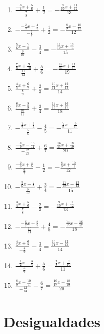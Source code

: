 \documentclass[12pt]{article}
\theoremstyle{plain}
\theoremstyle{definition}
\theoremstyle{remark}
\begin{document}
\begin{enumerate}
  \begin{enumerate}
  \def\labelenumii{\roman{enumii}.}
  \item
    \(\frac{-\frac{3}{4}x+\frac{5}{6}}{-\frac{7}{8}}+\frac{1}{2}=-\frac{\frac{9}{10}x+\frac{11}{12}}{13}\)
  \item
    \(-\frac{-\frac{2}{3}x+\frac{4}{5}}{-\frac{6}{7}}+\frac{1}{2}=-\frac{\frac{8}{9}x+\frac{10}{11}}{12}\)
  \item
    \(\frac{\frac{5}{6}x-\frac{7}{8}}{\frac{9}{10}}-\frac{3}{4}=-\frac{\frac{11}{12}x+\frac{13}{14}}{15}\)
  \item
    \(\frac{\frac{7}{8}x+\frac{9}{10}}{\frac{11}{12}}+\frac{5}{6}=-\frac{\frac{15}{16}x+\frac{17}{18}}{19}\)
  \item
    \(\frac{\frac{4}{5}x+\frac{6}{7}}{\frac{8}{9}}+\frac{2}{3}=\frac{\frac{10}{11}x+\frac{12}{13}}{14}\)
  \item
    \(\frac{\frac{6}{7}x-\frac{8}{9}}{\frac{10}{11}}+\frac{3}{4}=\frac{\frac{14}{15}x+\frac{16}{17}}{18}\)
  \item
    \(-\frac{\frac{1}{2}x+\frac{3}{4}}{\frac{5}{6}}-\frac{4}{5}=-\frac{\frac{7}{8}x-\frac{9}{10}}{11}\)
  \item
    \(\frac{-\frac{8}{9}x-\frac{10}{11}}{-\frac{12}{13}}+\frac{6}{7}=\frac{\frac{16}{17}x+\frac{18}{19}}{20}\)
  \item
    \(\frac{-\frac{2}{3}x+\frac{4}{5}}{\frac{6}{7}}-\frac{1}{2}=-\frac{\frac{8}{9}x+\frac{10}{11}}{12}\)
  \item
    \(-\frac{\frac{5}{6}x-\frac{7}{8}}{\frac{9}{10}}+\frac{3}{4}=-\frac{\frac{11}{12}x-\frac{13}{14}}{15}\)
  \item
    \(\frac{\frac{3}{4}x+\frac{5}{6}}{\frac{7}{8}}-\frac{2}{3}=-\frac{\frac{9}{10}x+\frac{11}{12}}{13}\)
  \item
    \(-\frac{-\frac{6}{7}x+\frac{8}{9}}{\frac{10}{11}}+\frac{4}{5}=-\frac{\frac{14}{15}x-\frac{16}{17}}{18}\)
  \item
    \(\frac{\frac{4}{5}x+\frac{6}{7}}{-\frac{8}{9}}-\frac{3}{4}=\frac{\frac{10}{11}x-\frac{12}{13}}{14}\)
  \item
    \(\frac{-\frac{1}{2}x-\frac{3}{4}}{\frac{5}{6}}+\frac{5}{6}=\frac{\frac{7}{8}x+\frac{9}{10}}{11}\)
  \item
    \(\frac{\frac{8}{9}x-\frac{10}{11}}{-\frac{12}{13}}-\frac{6}{7}=\frac{\frac{16}{17}x-\frac{18}{19}}{20}\)
  \end{enumerate}
\end{enumerate}

\section{Desigualdades}\label{desigualdades}
\end{document}
